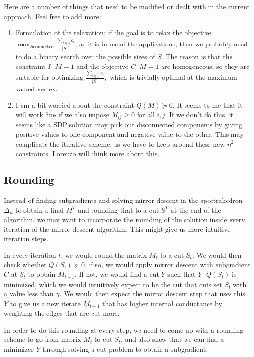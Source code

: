 \documentclass{article}
\begin{document}
Here are a number of things that need to be modified or dealt with in the current approach. Feel free to add more:
\begin{enumerate}
\item Formulation of the relaxation: if the goal is to relax the objective: $\max_{S \textrm{connected}} \frac{\sum_{i \in S} c_i}{|S|^2}$, as it is in oneof the applications, then we probably need to do a binary search over the possible sizes of $S.$ The reason is that the constraint $I \cdot M = 1$ and the objective $C \cdot M = 1$ are homogeneous, so they are suitable for optimizing $\frac{\sum_{i \in S} c_i}{|S|},$ which is trivially optimal at the maximum valued vertex.
\item I am a bit worried about the constraint $Q(M) \succeq 0.$ It seems to me that it will work fine if we also impose $M_{ij} \geq 0$ for all $i,j.$  If we don't do this, it seems like a SDP solution may pick out disconnected components by giving positive values to one component and negative value to the other. This may complicate the iterative scheme, as we have to keep around these new $n^2$ constraints. Lorenzo will think more about this.
\end{enumerate}



\subsection*{Rounding}

Instead of finding subgradients and solving mirror descent in the spectrahedron $\Delta_n$ to obtain a final $M^T$ and rounding that to a cut $S^T$ at the end of the algorithm, we may want to incorporate the rounding of the solution inside every iteration of the mirror descent algorithm. This might give us more intuitive iteration steps.

In every iteration $t$, we would round the matrix $M_t$ to a cut $S_t$. We would then check whether $Q(S_t) \succeq 0$, if so, we would apply mirror descent with subgradient $C$ at $S_t$ to obtain $M_{t+1}$. If not, we would find a cut $Y$ such that $Y \cdot Q(S_t)$ is minimized, which we would intuitively expect to be the cut that cuts set $S_t$ with a value less than $\gamma$. We would then expect the mirror descent step that uses this $Y$ to give us a new iterate $M_{t+1}$ that has higher internal conductance by weighting the edges that are cut more.

In order to do this rounding at every step, we need to come up with a rounding scheme to go from matrix $M_t$ to cut $S_t$, and also show that we can find a minimizer $Y$ through solving a cut problem to obtain a subgradient.
\end{document}
